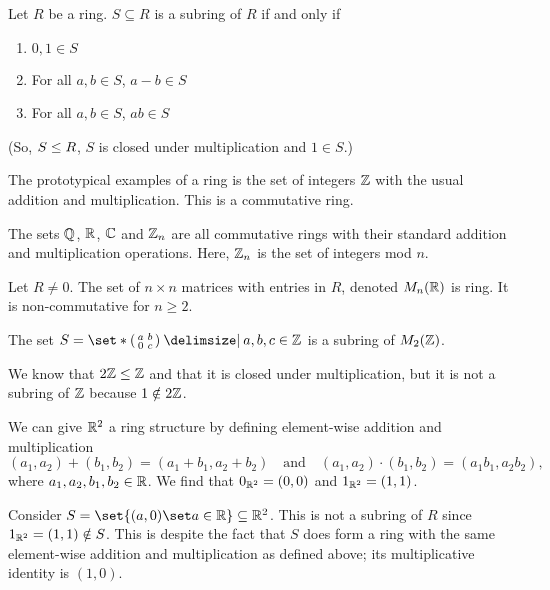 \documentclass[11pt]{penrose}
\begin{document}
\begin{nlemma}
    Let $R$ be a ring. $S \subseteq R$ is a subring of $R$ if and only if
    \begin{enumerate}[label=(\roman*)]
        \item $0, 1 \in S$
        \item For all $a, b \in S$, $a-b \in S$
        \item For all $a, b \in S$, $ab \in S$
    \end{enumerate}
    (So, $S \mathrel{\leq} R$, $S$ is closed under multiplication and $1 \in S$.)
\end{nlemma}

\begin{negg}
    The prototypical examples of a ring is the set of integers $\mathbb{Z}$ with the usual addition and multiplication. This is a commutative ring.
\end{negg}

\begin{negg}
    The sets $\mathbb{Q}$, $\mathbb{R}$, $\mathbb{C}$ and $\mathbb{Z}_n$ are all commutative rings with their standard addition and multiplication operations. Here, $\mathbb{Z}_n$ is the set of integers mod $n$.

    Let $R \neq 0$. The set of $n \times n$ matrices with entries in $R$, denoted $M_n (\mathbb{R})$ is ring. It is non-commutative for $n \geq 2$.
\end{negg}

\begin{negg}
    The set $S = \set*{\begin{psmallmatrix*} a & b \\ 0 & c \end{psmallmatrix*} \st a, b, c \in \Z}$ is a subring of $M_2 (\mathbb{Z})$.

    We know that $2\mathbb{Z} \mathrel{\leq} \mathbb{Z}$ and that it is closed under multiplication, but it is not a subring of $\mathbb{Z}$ because $1 \notin 2\mathbb{Z}$.
\end{negg}

\begin{negg}
    We can give $\mathbb{R}^2$ a ring structure by defining element-wise addition and multiplication
    \begin{equation}
        (a_1, a_2) + (b_1, b_2) = (a_1 + b_1, a_2 + b_2)
        \quad\text{and}\quad
        (a_1, a_2) \cdot (b_1, b_2) = (a_1 b_1, a_2 b_2),
    \end{equation}
    where $a_1, a_2, b_1, b_2 \in \mathbb{R}$. We find that $0_{\mathbb{R}^2} = (0,0)$ and $1_{\mathbb{R}^2} = (1,1)$.

    Consider $S = \set{(a,0) \set a \in \R} \subseteq \R^2$. This is not a subring of $R$ since $1_{\mathbb{R}^2} = (1,1) \notin S$. This is despite the fact that $S$ does form a ring with the same element-wise addition and multiplication as defined above; its multiplicative identity is $(1,0)$.
\end{negg}
\end{document}
